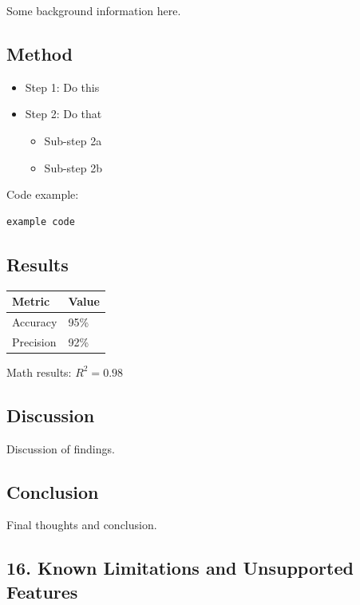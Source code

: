 \documentclass{article}
\begin{document}
Some background information here.

\subsection{ Method}

\begin{itemize}
\item  Step 1: Do this
\item  Step 2: Do that
\begin{itemize}
\item  Sub-step 2a
\item  Sub-step 2b
\end{itemize}


\end{itemize}

Code example:

\begin{verbatim}
example code
\end{verbatim}

\subsection{ Results}

\begin{tabular}{ll}
\hline
 Metric  &  Value  \\
\hline
 Accuracy  &  95\%  \\
 Precision  &  92\%  \\
\hline
\end{tabular}

Math results: $R^2 = 0.98$

\subsection{ Discussion}

Discussion of findings.

\subsection{ Conclusion}

Final thoughts and conclusion.

\noindent\hrulefill

\subsection{ 16. Known Limitations and Unsupported Features}
\end{document}
